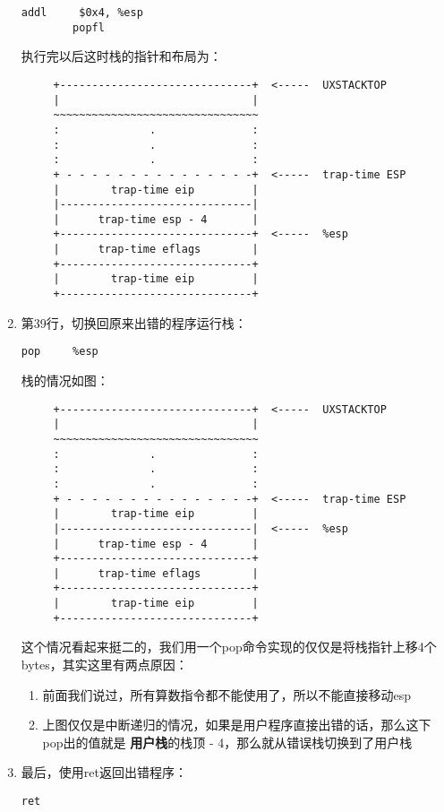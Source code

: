 \documentclass{article}
\newcommand{\highlight}[1]{{\bfseries \color{red}  #1}}
\begin{document}
\begin{CJK*}{UTF8}{gkai}
\begin{enumerate}
{\begin{lstlisting}[style=acode, firstnumber=33, title={\scriptsize \ttfamily \bfseries lib/pfentry.S}]
        addl     $0x4, %esp
        popfl
\end{lstlisting}

执行完以后这时栈的指针和布局为：

{\scriptsize \bfseries
\begin{verbatim}
     +------------------------------+  <-----  UXSTACKTOP
     |                              | 
     ~~~~~~~~~~~~~~~~~~~~~~~~~~~~~~~~
     :              .               :
     :              .               :
     :              .               :
     + - - - - - - - - - - - - - - -+  <-----  trap-time ESP
     |        trap-time eip         |
     |------------------------------|  
     |      trap-time esp - 4       | 
     +------------------------------+  <-----  %esp
     |      trap-time eflags        |
     +------------------------------+ 
     |        trap-time eip         |
     +------------------------------+ 
\end{verbatim}
}
}
\item{第39行，切换回原来出错的程序运行栈：

\begin{lstlisting}[style=acode, firstnumber=39, title={\scriptsize \ttfamily \bfseries lib/pfentry.S}]
        pop     %esp
\end{lstlisting}

栈的情况如图：

{\scriptsize \bfseries
\begin{verbatim}
     +------------------------------+  <-----  UXSTACKTOP
     |                              | 
     ~~~~~~~~~~~~~~~~~~~~~~~~~~~~~~~~
     :              .               :
     :              .               :
     :              .               :
     + - - - - - - - - - - - - - - -+  <-----  trap-time ESP
     |        trap-time eip         |
     |------------------------------|  <-----  %esp  
     |      trap-time esp - 4       | 
     +------------------------------+ 
     |      trap-time eflags        |
     +------------------------------+ 
     |        trap-time eip         |
     +------------------------------+ 
\end{verbatim}
}

这个情况看起来挺二的，我们用一个pop命令实现的仅仅是将栈指针上移4个bytes，其实这里有两点原因：

\begin{enumerate}
\item{前面我们说过，所有算数指令都不能使用了，所以不能直接移动esp}
\item{上图仅仅是中断递归的情况，如果是用户程序直接出错的话，那么这下pop出的值就是\highlight{用户栈}的栈顶 - 4，那么就从错误栈切换到了用户栈}
\end{enumerate}
}
\item{最后，使用ret返回出错程序：
\begin{lstlisting}[style=acode, firstnumber=44, title={\scriptsize \ttfamily \bfseries lib/pfentry.S}]
        ret
\end{lstlisting}

}
\end{enumerate}
\end{CJK*}
\end{document}
